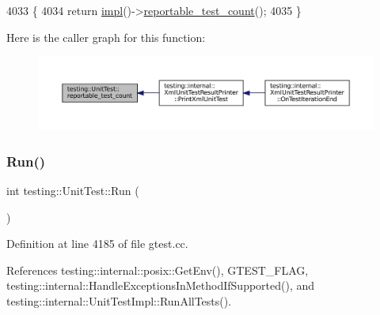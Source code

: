 \begin{DoxyCode}
4033                                           \{
4034   \textcolor{keywordflow}{return} \hyperlink{classtesting_1_1UnitTest_a4df5d11a58affb337d7fa62eaa07690e}{impl}()->\hyperlink{classtesting_1_1internal_1_1UnitTestImpl_addb3896c4e0973bb5d2744fcb158afce}{reportable\_test\_count}();
4035 \}
\end{DoxyCode}
Here is the caller graph for this function\+:
\nopagebreak
\begin{figure}[H]
\begin{center}
\leavevmode
\includegraphics[width=350pt]{classtesting_1_1UnitTest_a449d0e0350ef146040cd37679c005248_icgraph}
\end{center}
\end{figure}
\mbox{\label{classtesting_1_1UnitTest_a2febc800536b44500565f4c423f359d3}} 
\subsubsection{\texorpdfstring{Run()}{Run()}}
{\footnotesize\ttfamily int testing\+::\+Unit\+Test\+::\+Run (\begin{DoxyParamCaption}{ }\end{DoxyParamCaption})}



Definition at line 4185 of file gtest.\+cc.



References testing\+::internal\+::posix\+::\+Get\+Env(), G\+T\+E\+S\+T\+\_\+\+F\+L\+AG, testing\+::internal\+::\+Handle\+Exceptions\+In\+Method\+If\+Supported(), and testing\+::internal\+::\+Unit\+Test\+Impl\+::\+Run\+All\+Tests().



